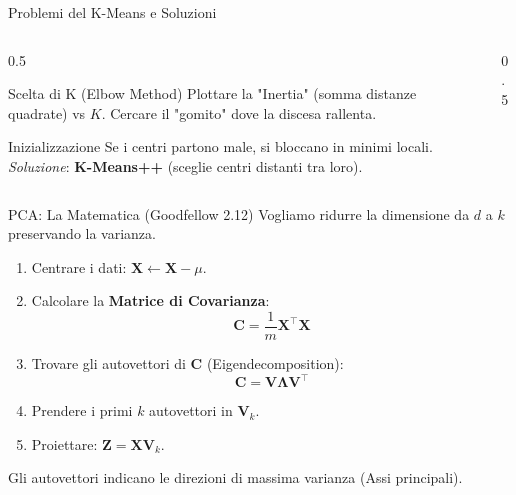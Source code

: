 \documentclass[aspectratio=169, 10pt]{beamer}
\begin{document}
\begin{frame}{Problemi del K-Means e Soluzioni}
    \begin{columns}[T]
        \begin{column}{0.5\textwidth}
            \begin{block}{Scelta di K (Elbow Method)}
                Plottare la "Inertia" (somma distanze quadrate) vs $K$.
                Cercare il "gomito" dove la discesa rallenta.
            \end{block}
            \vspace{0.5em}
            \begin{block}{Inizializzazione}
                Se i centri partono male, si bloccano in minimi locali.
                \emph{Soluzione}: \textbf{K-Means++} (sceglie centri distanti tra loro).
            \end{block}
        \end{column}
        \begin{column}{0.5\textwidth}
            \centering
        \end{column}
    \end{columns}
\end{frame}

\begin{frame}{PCA: La Matematica (Goodfellow 2.12)}
    Vogliamo ridurre la dimensione da $d$ a $k$ preservando la varianza.
    
    \begin{enumerate}
        \item Centrare i dati: $\mathbf{X} \leftarrow \mathbf{X} - \mu$.
        \item Calcolare la \textbf{Matrice di Covarianza}:
        \[ \mathbf{C} = \frac{1}{m} \mathbf{X}^\top \mathbf{X} \]
        \item Trovare gli autovettori di $\mathbf{C}$ (Eigendecomposition):
        \[ \mathbf{C} = \mathbf{V} \mathbf{\Lambda} \mathbf{V}^\top \]
        \item Prendere i primi $k$ autovettori in $\mathbf{V}_k$.
        \item Proiettare: $\mathbf{Z} = \mathbf{X} \mathbf{V}_k$.
    \end{enumerate}
    
    \small Gli autovettori indicano le direzioni di massima varianza (Assi principali).
\end{frame}
\end{document}
